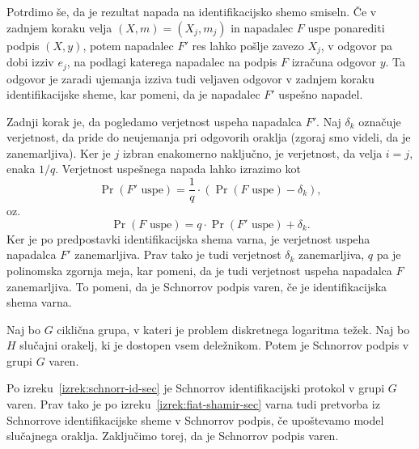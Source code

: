 \begin{dokaz}
    Potrdimo še, da je rezultat napada na identifikacijsko shemo smiseln. Če v zadnjem koraku velja
    $(X, m) = (X_j, m_j)$ in napadalec $F$ uspe ponarediti podpis $(X, y)$, potem napadalec $F'$
    res lahko pošlje zavezo $X_j$, v odgovor pa dobi izziv $e_j$, na podlagi katerega napadalec na
    podpis $F$ izračuna odgovor $y$. Ta odgovor je zaradi ujemanja izziva tudi veljaven odgovor
    v zadnjem koraku identifikacijske sheme, kar pomeni, da je napadalec $F'$ uspešno napadel.

    Zadnji korak je, da pogledamo verjetnost uspeha napadalca $F'$. Naj $\delta_k$ označuje verjetnost,
    da pride do neujemanja pri odgovorih oraklja (zgoraj smo videli, da je zanemarljiva). Ker je $j$
    izbran enakomerno naključno, je verjetnost, da velja $i=j$, enaka $1/q$. Verjetnost uspešnega
    napada lahko izrazimo kot
    $$
    \Pr(F' \text{ uspe}) = \frac{1}{q} \cdot (\Pr(F \text{ uspe}) - \delta_k),
    $$
    oz.
    $$
    \Pr(F \text{ uspe}) = q \cdot \Pr(F' \text{ uspe}) + \delta_k.
    $$
    Ker je po predpostavki identifikacijska shema varna, je verjetnost uspeha napadalca $F'$
    zanemarljiva. Prav tako je tudi verjetnost $\delta_k$ zanemarljiva, $q$ pa je polinomska zgornja
    meja, kar pomeni, da je tudi verjetnost uspeha napadalca $F$ zanemarljiva. To pomeni, da je
    Schnorrov podpis varen, če je identifikacijska shema varna.
\end{dokaz}

\begin{izrek}
    Naj bo $G$ ciklična grupa, v kateri je problem diskretnega logaritma težek. Naj bo $H$ slučajni
    orakelj, ki je dostopen vsem deležnikom. Potem je Schnorrov podpis v grupi $G$ varen.
\end{izrek}

\begin{dokaz}
    Po izreku~\ref{izrek:schnorr-id-sec} je Schnorrov identifikacijski protokol v grupi $G$ varen.
    Prav tako je po izreku~\ref{izrek:fiat-shamir-sec} varna tudi pretvorba iz Schnorrove identifikacijske
    sheme v Schnorrov podpis, če upoštevamo model slučajnega oraklja. Zaključimo torej, da je
    Schnorrov podpis varen.
\end{dokaz}

